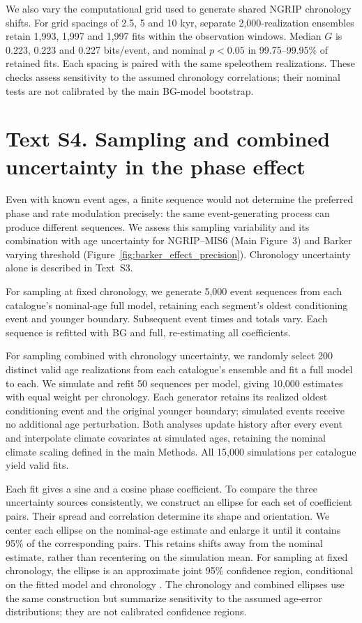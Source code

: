 \documentclass[11pt]{article}
\begin{document}
We also vary the computational grid used to generate shared NGRIP chronology shifts. For grid spacings of 2.5, 5 and 10 kyr, separate 2,000-realization ensembles retain 1,993, 1,997 and 1,997 fits within the observation windows. Median $G$ is 0.223, 0.223 and 0.227 bits/event, and nominal $p<0.05$ in 99.75--99.95\% of retained fits. Each spacing is paired with the same speleothem realizations. These checks assess sensitivity to the assumed chronology correlations; their nominal tests are not calibrated by the main BG-model bootstrap.

\section*{Text S4. Sampling and combined uncertainty in the phase effect}

Even with known event ages, a finite sequence would not determine the preferred phase and rate modulation precisely: the same event-generating process can produce different sequences. We assess this sampling variability and its combination with age uncertainty for NGRIP--MIS6 (Main Figure~3) and Barker varying threshold (Figure~\ref{fig:barker_effect_precision}). Chronology uncertainty alone is described in Text~S3.

For sampling at fixed chronology, we generate 5,000 event sequences from each catalogue's nominal-age full model, retaining each segment's oldest conditioning event and younger boundary. Subsequent event times and totals vary. Each sequence is refitted with BG and full, re-estimating all coefficients.

For sampling combined with chronology uncertainty, we randomly select 200 distinct valid age realizations from each catalogue's ensemble and fit a full model to each. We simulate and refit 50 sequences per model, giving 10,000 estimates with equal weight per chronology. Each generator retains its realized oldest conditioning event and the original younger boundary; simulated events receive no additional age perturbation. Both analyses update history after every event and interpolate climate covariates at simulated ages, retaining the nominal climate scaling defined in the main Methods. All 15,000 simulations per catalogue yield valid fits.

Each fit gives a sine and a cosine phase coefficient. To compare the three uncertainty sources consistently, we construct an ellipse for each set of coefficient pairs. Their spread and correlation determine its shape and orientation. We center each ellipse on the nominal-age estimate and enlarge it until it contains 95\% of the corresponding pairs. This retains shifts away from the nominal estimate, rather than recentering on the simulation mean. For sampling at fixed chronology, the ellipse is an approximate joint 95\% confidence region, conditional on the fitted model and chronology \citep{davison1997bootstrap}. The chronology and combined ellipses use the same construction but summarize sensitivity to the assumed age-error distributions; they are not calibrated confidence regions.
\end{document}
